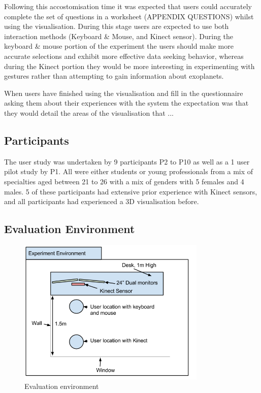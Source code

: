 Following this accostomisation time it was expected that users could accurately
complete the set of questions in a worksheet (APPENDIX QUESTIONS) whilst using
the visualisation. During this stage users are expected to use both interaction
methods (Keyboard \& Mouse, and Kinect sensor). During the keyboard \& mouse
portion of the experiment the users should make more accurate selections and
exhibit more effective data seeking behavior, whereas during the Kinect portion
they would be more interesting in experimenting with gestures rather than
attempting to gain information about exoplanets. 

When users have finished using the visualisation and fill in the questionnaire
asking them about their experiences with the system the expectation was that
they would detail the areas of the visualisation that ...~

\subsection{Participants}
The user study was undertaken by 9 participants P2 to P10 as well as a 1 user
pilot study by P1. All were either students or
young professionals from a mix of specialties aged between 21 to 26 with a mix
of genders with 5 females and 4 males. 5 of these participants had extensive
prior experience with Kinect sensors, and all participants had experienced a 3D
visualisation before.

\subsection{Evaluation Environment}
\begin{figure}[H]
  \centering
      \includegraphics[width=0.8\textwidth]{images/environment.png}
  \caption{Evaluation environment}  
    \label{fig:environment}
\end{figure}


